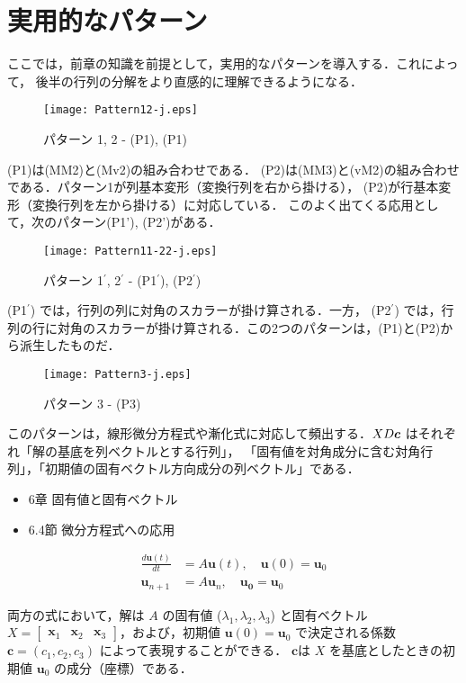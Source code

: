 \documentclass[letterpaper]{article}
\newcommand{\bi}[1]{\hbox{\boldmath$#1$}}
\begin{document}
\section{実用的なパターン}

ここでは，前章の知識を前提として，実用的なパターンを導入する．これによって，
後半の行列の分解をより直感的に理解できるようになる．

\begin{figure}[H]
  \centering
  \texttt{[image: Pattern12-j.eps]}
  \caption{パターン 1, 2 - (P1), (P1)}
\end{figure}

(P1)は(MM2)と(Mv2)の組み合わせである．
(P2)は(MM3)と(vM2)の組み合わせである．パターン1が列基本変形（変換行列を右から掛ける），
(P2)が行基本変形（変換行列を左から掛ける）に対応している．
このよく出てくる応用として，次のパターン(P1'), (P2')がある．

\begin{figure}[H]
  \centering
  \texttt{[image: Pattern11-22-j.eps]}
  \caption{パターン 1$^\prime$, 2$^\prime$ - (P1$^\prime$), (P2$^\prime$)}
\end{figure}

(P1$^\prime$) では，行列の列に対角のスカラーが掛け算される．一方，
(P2$^\prime$) では，行列の行に対角のスカラーが掛け算される．この2つのパターンは，(P1)と(P2)から派生したものだ．

\begin{figure}[H]
  \centering
  \texttt{[image: Pattern3-j.eps]}
  \caption{パターン 3 - (P3)}
\end{figure}

このパターンは，線形微分方程式や漸化式に対応して頻出する．$XD\bi{c}$ はそれぞれ「解の基底を列ベクトルとする行列」，
「固有値を対角成分に含む対角行列」，「初期値の固有ベクトル方向成分の列ベクトル」である．

\begin{itemize}
  \item 6章 固有値と固有ベクトル
  \item 6.4節 微分方程式への応用
\end{itemize} 

\begin{align*}
  \frac{d \bm{u}(t) }{dt} &= A \bm{u}(t), \quad \bm{u}(0) =\bm{u}_0\\
  \bm{u}_{n+1} &= A \bm{u}_n, \quad \bm{u_0} = \bm{u}_0
\end{align*}

両方の式において，解は $A$ の固有値 ($\lambda_1, \lambda_2, \lambda_3$) と固有ベクトル
$X=\begin{bmatrix} \bm{x}_1 & \bm{x}_2 & \bm{x}_3 \end{bmatrix}$，および，初期値
$\bm{u}(0)=\bm{u}_0$ で決定される係数$\bm{c}=(c_1, c_2, c_3)$ によって表現することができる．
$\bm{c}$は $X$ を基底としたときの初期値 $\bm{u}_0$ の成分（座標）である．
\end{document}
